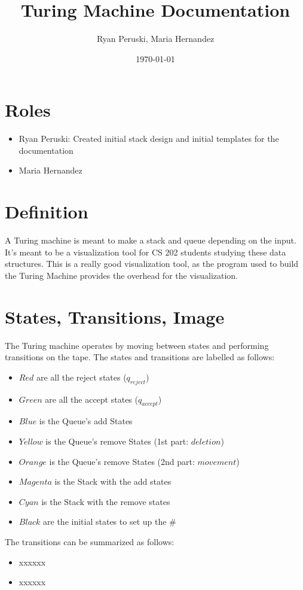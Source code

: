 \documentclass{article}
\title{Turing Machine Documentation}
\author{Ryan Peruski, Maria Hernandez}
\date{\today}
\begin{document}
\maketitle
\section{Roles}

\begin{itemize}
    \item Ryan Peruski: Created initial stack design and initial templates for the documentation
    \item Maria Hernandez
\end{itemize}
\section{Definition}
A Turing machine is meant to make a stack and queue depending on the input. It's meant to be a visualization tool for CS 202 students
studying these data structures. This is a really good visualization tool, as the program used to build the Turing Machine provides the overhead for
the visualization.

\section{States, Transitions, Image}
The Turing machine operates by moving between states and performing transitions on the tape. The states and transitions are labelled as follows:

\begin{itemize}
    \item $Red$ are all the reject states ($q_{reject}$)
    \item $Green$ are all the accept states ($q_{accept}$)
    \item $Blue$ is the Queue's add States
    \item $Yellow$ is the Queue's remove States (1st part: $deletion$)
    \item $Orange$ is the Queue's remove States  (2nd part: $movement$)
    \item $Magenta$ is the Stack with the add states
    \item $Cyan$ is the Stack with the remove states
    \item $Black$ are the initial states to set up the $\#$
\end{itemize}

The transitions can be summarized as follows:
\begin{itemize}
    \item xxxxxx
    \item xxxxxx
\end{itemize}
\end{document}
